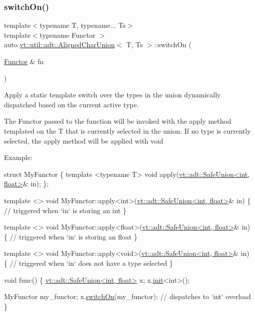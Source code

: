 \subsubsection{\texorpdfstring{switch\+On()}{switchOn()}}
{\footnotesize\ttfamily template$<$typename T, typename... Ts$>$ \\
template$<$typename Functor $>$ \\
auto \hyperlink{structvt_1_1util_1_1adt_1_1_aligned_char_union}{vt\+::util\+::adt\+::\+Aligned\+Char\+Union}$<$ T, Ts $>$\+::switch\+On (\begin{DoxyParamCaption}\item[{\hyperlink{namespacevt_af182285b57b225b163d5d8aff03cb8c2ac61e9f48e514369f0eb8ac5cebf9fb14}{Functor} \&}]{fn }\end{DoxyParamCaption})\hspace{0.3cm}{\ttfamily [inline]}}



Apply a static template switch over the types in the union dynamically dispatched based on the current active type. 

The {\ttfamily Functor} passed to the function will be invoked with the {\ttfamily apply} method templated on the {\ttfamily T} that is currently selected in the union. If no type is currently selected, the {\ttfamily apply} method will be applied with {\ttfamily void} 

Example\+: 
\begin{DoxyCode}
\textcolor{keyword}{struct }MyFunctor \{
  \textcolor{keyword}{template} <\textcolor{keyword}{typename} T>
  \textcolor{keywordtype}{void} apply(\hyperlink{structvt_1_1util_1_1adt_1_1_aligned_char_union}{vt::adt::SafeUnion<int, float>}& in);
\};

\textcolor{keyword}{template} <>
\textcolor{keywordtype}{void} MyFunctor::apply<int>(\hyperlink{structvt_1_1util_1_1adt_1_1_aligned_char_union}{vt::adt::SafeUnion<int, float>}& in) \{
  \textcolor{comment}{// triggered when `in` is storing an int}
\}

\textcolor{keyword}{template} <>
\textcolor{keywordtype}{void} MyFunctor::apply<float>(\hyperlink{structvt_1_1util_1_1adt_1_1_aligned_char_union}{vt::adt::SafeUnion<int, float>}& in) \{
  \textcolor{comment}{// triggered when `in` is storing an float}
\}

\textcolor{keyword}{template} <>
\textcolor{keywordtype}{void} MyFunctor::apply<void>(\hyperlink{structvt_1_1util_1_1adt_1_1_aligned_char_union}{vt::adt::SafeUnion<int, float>}& in) \{
  \textcolor{comment}{// triggered when `in` does not have a type selected}
\}

\textcolor{keywordtype}{void} func() \{
  \hyperlink{structvt_1_1util_1_1adt_1_1_aligned_char_union}{vt::adt::SafeUnion<int, float>} x;
  x.\hyperlink{structvt_1_1util_1_1adt_1_1_aligned_char_union_a50f97a051cd59537528d6b5879f88a53}{init}<\textcolor{keywordtype}{int}>();

  MyFunctor my\_functor;
  x.\hyperlink{structvt_1_1util_1_1adt_1_1_aligned_char_union_a27ee4ceddaa0fda39ef9be9164959f11}{switchOn}(my\_functor); \textcolor{comment}{// dispatches to `int` overload}
\}
\end{DoxyCode}



